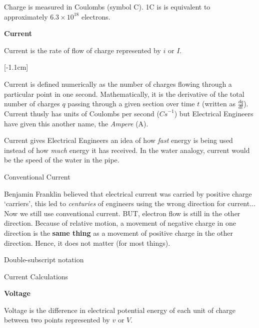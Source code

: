 \documentclass[12pt]{article}
\begin{document}
Charge is measured in Coulombs (symbol C).
1C is is equivalent to approximately $6.3 \times 10^{18}$ electrons.

\textbf{Current}
\begin{definition*}
   Current is the rate of flow of charge represented by $i$ or $I$.
\end{definition*}

[-1.1cm]

Current is defined numerically as the number of charges flowing through a particular point in one second.
Mathematically, it is the derivative of the total number of charges $q$ passing through a given section over time $t$ (written as $\frac{dq}{dt}$).
Current thusly has units of Coulombs per second ($\unit{Cs}^{-1}$) but Electrical Engineers have given this another name, the \textit{Ampere} (A).


Current gives Electrical Engineers an idea of how \textit{fast} energy is being used instead of how \textit{much} energy it has received.
In the water analogy, current would be the speed of the water in the pipe. 

\begin{theorem*}
  Conventional Current 

  Benjamin Franklin believed that electrical current was carried by positive charge `carriers', this led to \textit{centuries} of engineers using the wrong direction for current...
  Now we still use conventional current. BUT, electron flow is still in the other direction.
  Because of relative motion, a movement of negative charge in one direction is the \textbf{same thing} as a movement of positive charge in the other direction.
  Hence, it does not matter (for most things).
\end{theorem*}

\begin{theorem*}
  Double-subscript notation
\end{theorem*}

Current Calculations 

\textbf{Voltage}
\begin{definition*}
  Voltage is the difference in electrical potential energy of each unit of charge between two points represented by $v$ or $V$.
\end{definition*}
\end{document}
